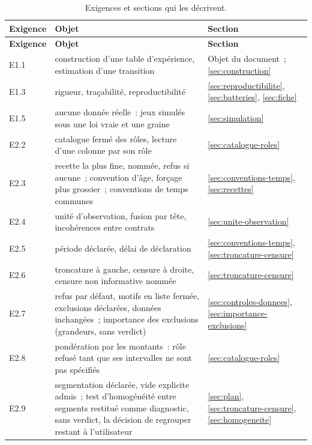 \documentclass[a4paper,11pt]{article}
\begin{document}
{\small
{}
\begin{longtable}{@{}p{1.6cm}p{8.6cm}p{4.6cm}@{}}
\caption{Exigences et sections qui les décrivent.}
\label{tab:tracabilite}\\
\rowcolor{tableheader}
\textcolor{financeblue}{\textbf{Exigence}} &
\textcolor{financeblue}{\textbf{Objet}} &
\textcolor{financeblue}{\textbf{Section}} \\
\endfirsthead
\rowcolor{tableheader}
\textcolor{financeblue}{\textbf{Exigence}} &
\textcolor{financeblue}{\textbf{Objet}} &
\textcolor{financeblue}{\textbf{Section}} \\
\endhead
E1.1 & construction d'une table d'expérience, estimation d'une transition & Objet du document~; \ref{sec:construction} \\
E1.3 & rigueur, traçabilité, reproductibilité & \ref{sec:reproductibilite}, \ref{sec:batteries}, \ref{sec:fiche} \\
E1.5 & aucune donnée réelle~: jeux simulés sous une loi vraie et une graine & \ref{sec:simulation} \\
E2.2 & catalogue fermé des rôles, lecture d'une colonne par son rôle & \ref{sec:catalogue-roles} \\
E2.3 & recette la plus fine, nommée, refus si aucune~; convention d'âge, forçage plus grossier~; conventions de temps communes & \ref{sec:conventions-temps}, \ref{sec:recettes} \\
E2.4 & unité d'observation, fusion par tête, incohérences entre contrats & \ref{sec:unite-observation} \\
E2.5 & période déclarée, délai de déclaration & \ref{sec:conventions-temps}, \ref{sec:troncature-censure} \\
E2.6 & troncature à gauche, censure à droite, censure non informative nommée & \ref{sec:troncature-censure} \\
E2.7 & refus par défaut, motifs en liste fermée, exclusions déclarées, données inchangées~; importance des exclusions (grandeurs, sans verdict) & \ref{sec:controles-donnees}, \ref{sec:importance-exclusions} \\
E2.8 & pondération par les montants~: rôle refusé tant que ses intervalles ne sont pas spécifiés & \ref{sec:catalogue-roles} \\
E2.9 & segmentation déclarée, vide explicite admis~; test d'homogénéité entre segments restitué comme diagnostic, sans verdict, la décision de regrouper restant à l'utilisateur & \ref{sec:plan}, \ref{sec:troncature-censure}, \ref{sec:homogeneite} \\

\end{longtable}}
\end{document}
